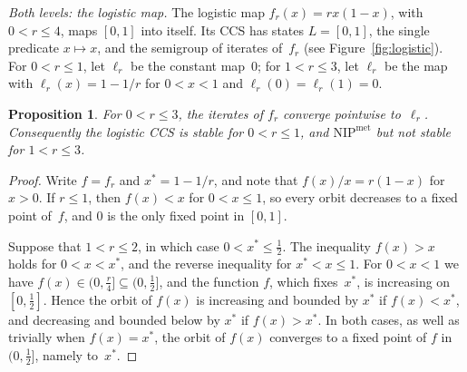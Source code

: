 \documentclass[psamsfonts]{amsart}
\newtheorem{prop}[thm]{Proposition}
\theoremstyle{definition}
\theoremstyle{remark}
\newcommand{\NIP}{\text{NIP}}
\numberwithin{equation}{section}
\begin{document}
\emph{Both levels: the logistic map.}
The logistic map $f_r(x)=rx(1-x)$, with $0<r\le4$, maps $[0,1]$ into itself.
Its CCS has states $L=[0,1]$, the single predicate $x\mapsto x$, and the
semigroup of iterates of~$f_r$ (see Figure~\ref{fig:logistic}).
For $0<r\le1$, let $\ell_r$ be the constant map~$0$; for $1<r\le3$, let
$\ell_r$ be the map with $\ell_r(x)=1-1/r$ for $0<x<1$ and $\ell_r(0)=\ell_r(1)=0$.

\begin{prop}\label{prop:logistic}
For $0<r\le3$, the iterates of $f_r$ converge pointwise to~$\ell_r$.
Consequently the logistic CCS is stable for $0<r\le1$, and $\NIP^{\mathrm{met}}$ but not
stable for $1<r\le3$.
\end{prop}

\begin{proof}
Write $f=f_r$ and $x^{*}=1-1/r$, and note that $f(x)/x=r(1-x)$ for $x>0$.
If $r\le1$, then $f(x)<x$ for $0<x\le1$, so every orbit decreases to a fixed
point of~$f$, and $0$ is the only fixed point in $[0,1]$.

Suppose that $1<r\le2$, in which case $0<x^{*}\le\frac12$.
The inequality $f(x)>x$ holds for $0<x<x^{*}$, and the reverse inequality for $x^{*}<x\le1$.
For $0<x<1$ we have $f(x)\in(0,\frac r4]\subseteq(0,\frac12]$, and the function $f$, which fixes~$x^{*}$, is
increasing on $[0,\frac12]$.
Hence the orbit of $f(x)$ is increasing and bounded by $x^{*}$ if $f(x)<x^{*}$, and
decreasing and bounded below by $x^{*}$ if $f(x)>x^{*}$.
In both cases, as well as trivially when $f(x)=x^{*}$, the orbit of $f(x)$ converges to a fixed point of $f$
in $(0,\frac12]$, namely to~$x^{*}$.


\end{proof}
\end{document}
